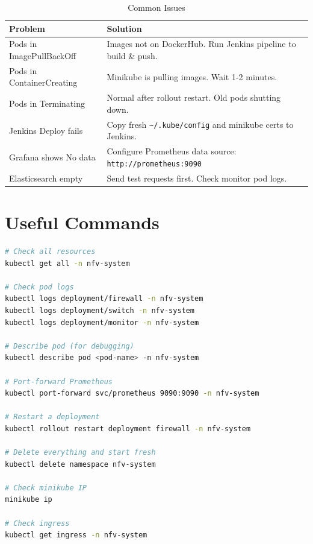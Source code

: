 \documentclass[12pt,a4paper]{article}
\begin{document}
\begin{table}[h]
\centering
\begin{tabular}{@{}lp{9cm}@{}}
\toprule
\textbf{Problem} & \textbf{Solution} \\
\midrule
Pods in ImagePullBackOff & Images not on DockerHub. Run Jenkins pipeline to build \& push. \\
Pods in ContainerCreating & Minikube is pulling images. Wait 1-2 minutes. \\
Pods in Terminating & Normal after rollout restart. Old pods shutting down. \\
Jenkins Deploy fails & Copy fresh \texttt{\~{}/.kube/config} and minikube certs to Jenkins. \\
Grafana shows No data & Configure Prometheus data source: \texttt{http://prometheus:9090} \\
Elasticsearch empty & Send test requests first. Check monitor pod logs. \\
\bottomrule
\end{tabular}
\caption{Common Issues}
\end{table}

\section{Useful Commands}

\begin{lstlisting}[language=bash]
# Check all resources
kubectl get all -n nfv-system

# Check pod logs
kubectl logs deployment/firewall -n nfv-system
kubectl logs deployment/switch -n nfv-system
kubectl logs deployment/monitor -n nfv-system

# Describe pod (for debugging)
kubectl describe pod <pod-name> -n nfv-system

# Port-forward Prometheus
kubectl port-forward svc/prometheus 9090:9090 -n nfv-system

# Restart a deployment
kubectl rollout restart deployment firewall -n nfv-system

# Delete everything and start fresh
kubectl delete namespace nfv-system

# Check minikube IP
minikube ip

# Check ingress
kubectl get ingress -n nfv-system
\end{lstlisting}

\end{document}
